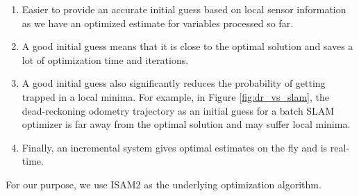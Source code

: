 \begin{enumerate}
\item Easier to provide an accurate initial guess based on local sensor information as we have an optimized estimate for variables processed so far. 
\item A good initial guess means that it is close to the optimal solution and saves a lot of optimization time and iterations.
\item A good initial guess also significantly reduces the probability of getting trapped in a local minima. For example, in Figure \ref{fig:dr_vs_slam}, the dead-reckoning odometry trajectory as an initial guess for a batch SLAM optimizer is far away from the optimal solution and may suffer local minima. 
\item Finally, an incremental system gives optimal estimates on the fly and is real-time.
\end{enumerate}
For our purpose, we use ISAM2 \cite{kaessisam2} as the underlying optimization algorithm.

